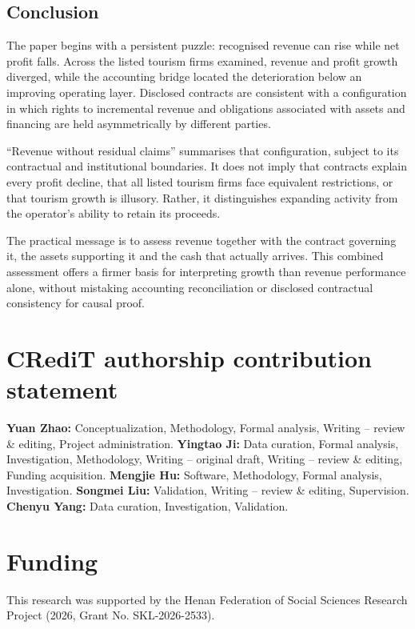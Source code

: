 \documentclass[review,3p,times]{elsarticle}
\begin{document}
\subsection{Conclusion}

The paper begins with a persistent puzzle: recognised revenue can rise while net profit falls. Across the listed tourism firms examined, revenue and profit growth diverged, while the accounting bridge located the deterioration below an improving operating layer. Disclosed contracts are consistent with a configuration in which rights to incremental revenue and obligations associated with assets and financing are held asymmetrically by different parties.

``Revenue without residual claims'' summarises that configuration, subject to its contractual and institutional boundaries. It does not imply that contracts explain every profit decline, that all listed tourism firms face equivalent restrictions, or that tourism growth is illusory. Rather, it distinguishes expanding activity from the operator's ability to retain its proceeds.

The practical message is to assess revenue together with the contract governing it, the assets supporting it and the cash that actually arrives. This combined assessment offers a firmer basis for interpreting growth than revenue performance alone, without mistaking accounting reconciliation or disclosed contractual consistency for causal proof.

\FloatBarrier

\section*{CRediT authorship contribution statement}

\textbf{Yuan Zhao:} Conceptualization, Methodology, Formal analysis, Writing -- review \& editing, Project administration. \textbf{Yingtao Ji:} Data curation, Formal analysis, Investigation, Methodology, Writing -- original draft, Writing -- review \& editing, Funding acquisition. \textbf{Mengjie Hu:} Software, Methodology, Formal analysis, Investigation. \textbf{Songmei Liu:} Validation, Writing -- review \& editing, Supervision. \textbf{Chenyu Yang:} Data curation, Investigation, Validation.

\section*{Funding}

This research was supported by the Henan Federation of Social Sciences Research Project (2026, Grant No. SKL-2026-2533).
\end{document}
